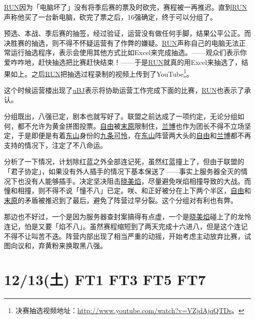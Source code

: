 \uline{RUN}因为「电脑坏了」没有将季后赛的票及时砍完，赛程被一再推迟。直到\uline{RUN}声称他买了一台新电脑，砍完了票之后，16强确定，终于可以分组了。

预选、本战、季后赛的抽签，经过验证，运营没有做任何手脚，结果公平公正。而决胜赛的抽选，则不得不怀疑运营有了作弊的嫌疑。\uline{RUN}声称自己的电脑无法正常运行抽选程序，表示会使用其他方式比如Excel来完成抽选。——观众们表示你爱咋咋地，赶快抽选把比赛赶快结束！——于是\uline{RUN}就真的用Excel来抽选了，结果如上。之后\uline{RUN}把抽选过程录制的视频上传到了YouTube\footnote{决赛抽选视频地址：\url{http://www.youtube.com/watch?v=VZjdAjqQTDs}。}。

这个时候运营楼出现了\uline{uBJ}表示将协助运营工作完成下面的比赛，\uline{RUN}也表示了承认。

分组既出，八强已定，剧本也就写好了。联盟之前达成了一项约定，无论分组如何，都不允许为黄金拼图投票。\uline{自由}被\uline{末原}限制住，\uline{兰博}也作为团长不得不立场坚定，于是即便是有着\uline{东山}身份的\uline{九条可怜}，在\uline{东山}阵营两大头的\uline{自由}和\uline{兰博}都不再支持的情况下，注定了不八命运。

分析了一下情况，计划除红蓝之外全部连记死，虽然红蓝撞上了，但由于联盟的「君子协定」，如果没有外人插手的情况下基本保送了——事实上服务器全灭的情况下也没有人能够插手。决定坚决阻击\uline{晓美焰}，尽量避免咲焰相撞导致的大战。而憧和相撞，则不得不说「憧不八」已定。咲、和正好被分在上下两个半区，\uline{自由}和\uline{末原}的矛盾被推迟到了最后，避免了阵营过早分裂。这个分组对有利也有弊。

那边也不好过，一个是因为服务器查封案搞得有点虚，一个是\uline{晓美焰}碰上了的龙怜连记，怕是又要「焰不八」。虽然赛程缩短到了两天完成十六进八，但是这个连记不得不让叫苦不迭。阵营内部出现了相当严重的动摇，开始考虑主动放弃比赛，试图向议和，弃黄粉来换取黑八强。

\section{12/13(土) FT1 FT3 FT5 FT7}

